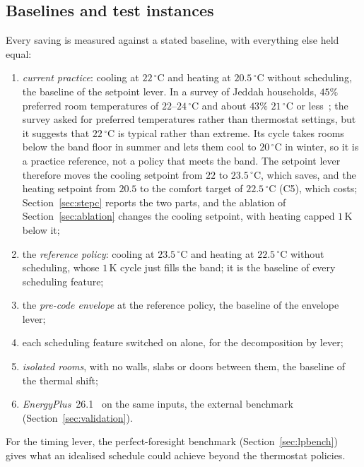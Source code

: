 \documentclass[10pt,a4paper,twocolumn]{article}
\theoremstyle{definition}
\begin{document}
\subsection{Baselines and test instances}\label{sec:baselines}
Every saving is measured against a stated baseline, with everything else held equal:
\begin{enumerate}[label=(B\arabic*),leftmargin=2.2em,itemsep=1pt,topsep=2pt]
\item \emph{current practice}: cooling at $22\,^{\circ}$C and heating at $20.5\,^{\circ}$C without scheduling, the baseline of the setpoint lever. In a survey of Jeddah households, $45\%$ preferred room temperatures of $22$--$24\,^{\circ}$C and about $43\%$ $21\,^{\circ}$C or less~\citep{sbc_envelope2021}; the survey asked for preferred temperatures rather than thermostat settings, but it suggests that $22\,^{\circ}$C is typical rather than extreme. Its cycle takes rooms below the band floor in summer and lets them cool to $20\,^{\circ}$C in winter, so it is a practice reference, not a policy that meets the band. The setpoint lever therefore moves the cooling setpoint from $22$ to $23.5\,^{\circ}$C, which saves, and the heating setpoint from $20.5$ to the comfort target of $22.5\,^{\circ}$C (C5), which costs; Section~\ref{sec:stepc} reports the two parts, and the ablation of Section~\ref{sec:ablation} changes the cooling setpoint, with heating capped $1\,$K below it;
\item the \emph{reference policy}: cooling at $23.5\,^{\circ}$C and heating at $22.5\,^{\circ}$C without scheduling, whose $1\,$K cycle just fills the band; it is the baseline of every scheduling feature;
\item the \emph{pre-code envelope} at the reference policy, the baseline of the envelope lever;
\item each scheduling feature switched on alone, for the decomposition by lever;
\item \emph{isolated rooms}, with no walls, slabs or doors between them, the baseline of the thermal shift;
\item \emph{EnergyPlus}~26.1~\citep{crawley2001energyplus} on the same inputs, the external benchmark (Section~\ref{sec:validation}).
\end{enumerate}
For the timing lever, the perfect-foresight benchmark (Section~\ref{sec:lpbench}) gives what an idealised schedule could achieve beyond the thermostat policies.
\end{document}
